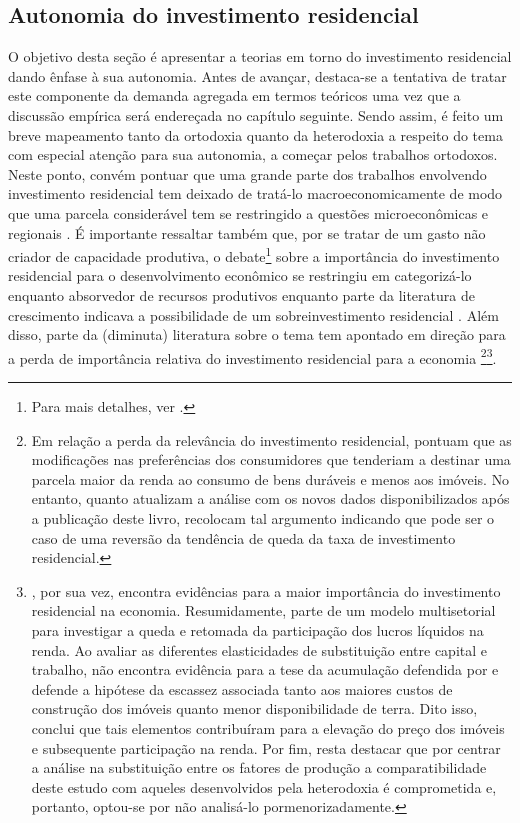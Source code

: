 \subsection{Autonomia do investimento residencial}
\label{RevResidencial}

O objetivo desta seção é apresentar a teorias em torno do investimento residencial dando ênfase à sua autonomia. Antes de avançar, destaca-se a tentativa de tratar este componente da demanda agregada em termos teóricos uma vez que a discussão empírica será endereçada no capítulo seguinte. 
Sendo assim, é feito um breve mapeamento tanto da ortodoxia quanto da heterodoxia a respeito do tema com especial atenção para sua autonomia, a começar pelos trabalhos ortodoxos.
Neste ponto, convém pontuar que uma grande parte dos trabalhos envolvendo investimento residencial tem deixado de tratá-lo macroeconomicamente de modo que uma parcela considerável tem se restringido a questões microeconômicas e regionais \cite{arestis_u.s._2008}.
É importante ressaltar também que, por se tratar de um gasto não criador de capacidade produtiva, o debate\footnote{Para mais detalhes, ver \textcite{arku_housing_2006}.} sobre a importância do investimento residencial para o desenvolvimento econômico se restringiu em categorizá-lo enquanto absorvedor de recursos produtivos \cite{solow_importance_1995} enquanto parte da literatura de crescimento indicava  a possibilidade de um sobreinvestimento residencial \cite{mills_has_1987}.
Além disso, parte da (diminuta) literatura sobre o tema tem apontado em direção para a perda de importância relativa do investimento residencial para a economia \cite{grebler_capital_1956}\footnote{
	Em relação a perda da relevância do investimento residencial, \textcite[p.~134-142]{grebler_capital_1956} pontuam que as modificações nas preferências dos consumidores que tenderiam a destinar uma parcela maior da renda ao consumo de bens duráveis e menos aos imóveis. No entanto, quanto atualizam a análise com os novos dados disponibilizados após a publicação deste livro, recolocam tal argumento indicando que pode ser o caso de uma reversão da tendência de queda da taxa de investimento residencial.
}\footnote{
	\textcite{rognlie_deciphering_2016}, por sua vez, encontra evidências para a maior importância do investimento residencial na economia.
	Resumidamente, parte de um modelo multisetorial para investigar a queda e retomada da participação dos lucros líquidos na renda.
	Ao avaliar as diferentes elasticidades de substituição entre capital e trabalho, não encontra evidência para a tese da acumulação defendida por \textcite{piketty_o_2014} e defende a hipótese da escassez associada tanto aos maiores custos de construção dos imóveis quanto menor disponibilidade de terra.
	Dito isso, conclui que tais elementos contribuíram para a elevação do preço dos imóveis e subsequente participação na renda.
	Por fim, resta destacar que por centrar a análise na substituição entre os fatores de produção a comparatibilidade deste estudo com aqueles desenvolvidos pela heterodoxia é comprometida e, portanto, optou-se por não analisá-lo pormenorizadamente.
}.

